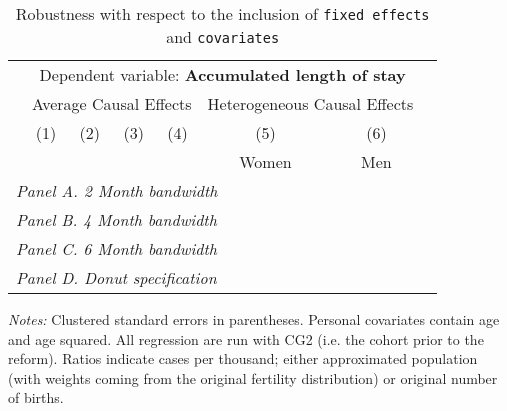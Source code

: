  \begin{table}[H] \begin{threeparttable} \centering \caption{Robustness with respect to the inclusion of \texttt{fixed effects} and \texttt{covariates}} {\def\sym#1{\ifmmode^{#1}\else\(^{#1}\)\fi} \begin{tabular}{l*{7}{c}} \toprule & \multicolumn{6}{c}{Dependent variable: \textbf{Accumulated length of stay}} \\ \cmidrule(lr){2-7}
            &\multicolumn{4}{c}{Average Causal Effects}         &\multicolumn{2}{c}{Heterogeneous Causal Effects}\\\cmidrule(lr){2-5}\cmidrule(lr){6-7}
            &\multicolumn{1}{c}{(1)}&\multicolumn{1}{c}{(2)}&\multicolumn{1}{c}{(3)}&\multicolumn{1}{c}{(4)}&\multicolumn{1}{c}{(5)}&\multicolumn{1}{c}{(6)}\\
            &\multicolumn{1}{c}{}&\multicolumn{1}{c}{}&\multicolumn{1}{c}{}&\multicolumn{1}{c}{}&\multicolumn{1}{c}{Women}&\multicolumn{1}{c}{Men}\\
\midrule
 \multicolumn{7}{l}{\emph{Panel A. 2 Month bandwidth}} \\    \midrule\multicolumn{7}{l}{\emph{Panel B. 4 Month bandwidth}} \\    \midrule\multicolumn{7}{l}{\emph{Panel C. 6 Month bandwidth}} \\    \midrule\multicolumn{7}{l}{\emph{Panel D. Donut specification}} \\    \midrule  
\bottomrule \end{tabular} } \begin{tablenotes} \item \scriptsize \emph{Notes:} Clustered standard errors in parentheses. Personal covariates contain age and age squared. All regression are run with CG2 (i.e. the cohort prior to the reform). Ratios indicate cases per thousand; either approximated population (with weights coming from the original fertility distribution) or original number of births. \end{tablenotes} \end{threeparttable} \end{table} 
